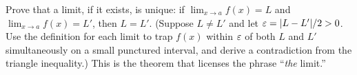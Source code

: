 \begin{exercise}
Prove that a limit, if it exists, is unique: if $\lim_{x\to a}f(x)=L$ and
$\lim_{x\to a}f(x)=L'$, then $L=L'$. (Suppose $L\ne L'$ and let
$\varepsilon=\lvert L-L'\rvert/2>0$. Use the definition for each limit to trap $f(x)$ within
$\varepsilon$ of both $L$ and $L'$ simultaneously on a small punctured interval, and
derive a contradiction from the triangle inequality.) This is the theorem that
licenses the phrase ``\emph{the} limit.''
\end{exercise}
